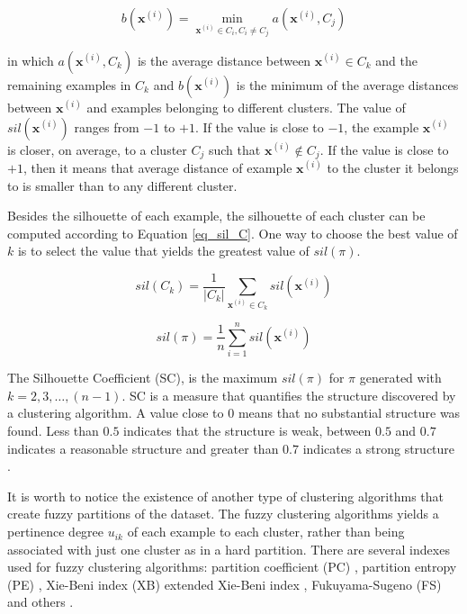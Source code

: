 \begin{equation}
    b(\mathbf{x}^{(i)})=\min_{\mathbf{x}^{(i)} \in C_i,
    C_i \neq C_j} a(\mathbf{x}^{(i)},C_j)
\end{equation}

\noindent
in which $a(\mathbf{x}^{(i)}, C_k)$ is the average distance between $\mathbf{x}^{(i)} \in C_k$ and the remaining examples in $C_k$ and $b(\mathbf{x}^{(i)})$ is the minimum of the average distances between $\mathbf{x}^{(i)}$ and examples belonging to different clusters. The value of $sil(\mathbf{x}^{(i)})$ ranges from $-1$ to $+1$. If the value is close to $-1$, the example $\mathbf{x}^{(i)}$ is closer, on average, to a cluster $C_j$ such that $\mathbf{x}^{(i)} \notin C_j$. If the value is close to $+1$, then it means that average distance of example $\mathbf{x}^{(i)}$ to the cluster it belongs to is smaller than to any different cluster.

Besides the silhouette of each example, the silhouette of each cluster can be computed according to Equation \ref{eq_sil_C}. One way to choose the best value of $k$ is to select the value that yields the greatest value of $sil(\pi)$.


\begin{equation}
\label{eq_sil_C}
    sil(C_k) = \frac{1}{|C_k|}\sum_{\mathbf{x}^{(i)} \in C_k} sil(\mathbf{x}^{(i)})
\end{equation}

\begin{equation}
    sil(\pi) = \frac{1}{n}\sum_{i = 1}^n sil(\mathbf{x}^{(i)})
\end{equation}


The Silhouette Coefficient (SC), is the maximum $sil(\pi)$ for $\pi$ generated with $k=2,3,\ldots, (n-1)$. SC is a measure that quantifies the structure discovered by a clustering algorithm. A value close to $0$ means that no substantial structure was found. Less than $0.5$ indicates that the structure is weak, between $0.5$ and $0.7$ indicates a reasonable structure and greater than $0.7$ indicates a strong structure \cite{carvalho2011inteligencia}.

It is worth to notice the existence of another type of clustering algorithms that create fuzzy partitions of the dataset. The fuzzy clustering algorithms yields a pertinence degree $u_{ik}$ of each example to each cluster, rather than being associated with just one cluster as in a hard partition. There are several indexes used for fuzzy clustering algorithms: partition coefficient (PC) \cite{pal1995cluster} , partition entropy (PE) \cite{pal1995cluster}, Xie-Beni index (XB) \cite{pal1995cluster} extended Xie-Beni index \cite{pal1995cluster}, Fukuyama-Sugeno (FS) \cite{pal1995cluster} and others \cite{pal1995cluster,pakhira2004validity}.


